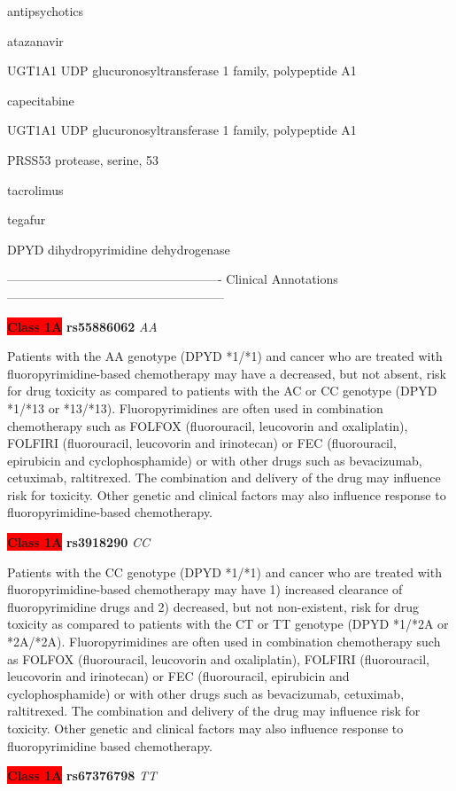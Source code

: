 \documentclass{resume} %
\begin{document}
\begin{rSection}{ antipsychotics }
\begin{rSection}{ atazanavir }
\begin{rSubsection}{ UGT1A1 }{ UDP glucuronosyltransferase 1 family, polypeptide A1 }{}{}
\begin{rSection}{ capecitabine }
\begin{rSubsection}{ UGT1A1 }{ UDP glucuronosyltransferase 1 family, polypeptide A1 }{}{}
\begin{rSubsection}{ PRSS53 }{ protease, serine, 53 }{}{}
\begin{rSection}{ tacrolimus }
\begin{rSection}{ tegafur }
\begin{rSubsection}{ DPYD }{ dihydropyrimidine dehydrogenase }{}{}
\item[] ---------------------------------------------------- Clinical Annotations -----------------------------------------------------\newline
\item \textbf{\colorbox{red} {Class 1A}} \textbf{ rs55886062 } \textit{ AA }
\item[] Patients with the AA genotype (DPYD *1/*1) and cancer who are treated with fluoropyrimidine-based chemotherapy may have a decreased, but not absent, risk for drug toxicity as compared to patients with the AC or CC genotype (DPYD *1/*13 or *13/*13). Fluoropyrimidines are often used in combination chemotherapy such as FOLFOX (fluorouracil, leucovorin and oxaliplatin), FOLFIRI (fluorouracil, leucovorin and irinotecan) or FEC (fluorouracil, epirubicin and cyclophosphamide) or with other drugs such as bevacizumab, cetuximab, raltitrexed. The combination and delivery of the drug may influence risk for toxicity. Other genetic and clinical factors may also influence response to fluoropyrimidine-based chemotherapy.\item \textbf{\colorbox{red} {Class 1A}} \textbf{ rs3918290 } \textit{ CC }
\item[] Patients with the CC genotype (DPYD *1/*1) and cancer who are treated with fluoropyrimidine-based chemotherapy may have 1) increased clearance of fluoropyrimidine drugs and 2) decreased, but not non-existent, risk for drug toxicity as compared to patients with the CT or TT genotype (DPYD *1/*2A or *2A/*2A). Fluoropyrimidines are often used in combination chemotherapy such as FOLFOX (fluorouracil, leucovorin and oxaliplatin), FOLFIRI (fluorouracil,  leucovorin and irinotecan) or FEC (fluorouracil, epirubicin and cyclophosphamide) or with other drugs such as bevacizumab, cetuximab, raltitrexed. The combination and delivery of the drug may influence risk for toxicity. Other genetic and clinical factors may also influence response to fluoropyrimidine based chemotherapy.\item \textbf{\colorbox{red} {Class 1A}} \textbf{ rs67376798 } \textit{ TT }

\end{rSubsection}
\end{rSection}
\end{rSection}
\end{rSubsection}
\end{rSubsection}
\end{rSection}
\end{rSubsection}
\end{rSection}
\end{rSection}
\end{document}
